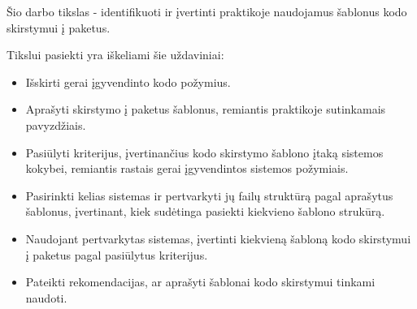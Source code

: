 Šio darbo tikslas - identifikuoti ir įvertinti praktikoje naudojamus šablonus kodo skirstymui į paketus.

Tikslui pasiekti yra iškeliami šie uždaviniai:
\begin{itemize}
    \item  Išskirti gerai įgyvendinto kodo požymius.
    \item  Aprašyti skirstymo į paketus šablonus, remiantis praktikoje sutinkamais pavyzdžiais.
    \item  Pasiūlyti kriterijus, įvertinančius kodo skirstymo šablono įtaką sistemos kokybei, remiantis
rastais gerai įgyvendintos sistemos požymiais.
    \item  Pasirinkti kelias sistemas ir pertvarkyti jų failų struktūrą pagal aprašytus šablonus, įvertinant,
kiek sudėtinga pasiekti kiekvieno šablono strukūrą.
    \item  Naudojant pertvarkytas sistemas, įvertinti kiekvieną šabloną kodo skirstymui į paketus pagal pasiūlytus kriterijus.
    \item  Pateikti rekomendacijas, ar aprašyti šablonai kodo skirstymui tinkami naudoti.
\end{itemize}




